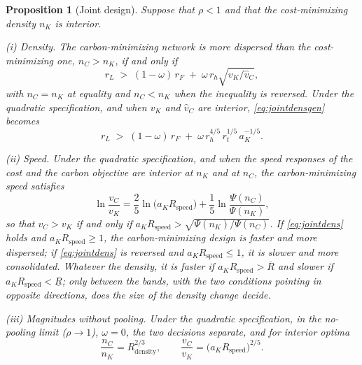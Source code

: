 \documentclass[11pt]{article}
\newtheorem{proposition}{Proposition}
\numberwithin{proposition}{section}
\theoremstyle{definition}
\theoremstyle{remark}
\theoremstyle{plain}
\begin{document}
\begin{proposition}[Joint design]\label{prop:classify}
Suppose that $\rho<1$ and that the cost-minimizing density $n_K$ is interior.

\smallskip\noindent\textup{(i)} \emph{Density.} The carbon-minimizing network is more dispersed than the
cost-minimizing one, $n_C>n_K$, if and only if
\begin{equation}\label{eq:jointdensgen}
  r_L\;>\;(1-\omega)\,r_F\;+\;\omega\,r_h\sqrt{v_K/\hat v_C},
\end{equation}
with $n_C=n_K$ at equality and $n_C<n_K$ when the inequality is reversed. Under the quadratic specification, and
when $v_K$ and $\hat v_C$ are interior, \eqref{eq:jointdensgen} becomes
\begin{equation}\label{eq:jointdens}
  r_L\;>\;(1-\omega)\,r_F\;+\;\omega\,r_h^{4/5}\,r_t^{1/5}\,a_K^{-1/5}.
\end{equation}

\smallskip\noindent\textup{(ii)} \emph{Speed.} Under the quadratic specification, and when the speed responses of
the cost and the carbon objective are interior at $n_K$ and at $n_C$, the carbon-minimizing speed satisfies
\begin{equation}\label{eq:speeddecomp}
  \ln\frac{v_C}{v_K}=\frac25\ln\big(a_KR_{\mathrm{speed}}\big)+\frac15\ln\frac{\Psi(n_C)}{\Psi(n_K)},
\end{equation}
so that $v_C>v_K$ if and only if $a_KR_{\mathrm{speed}}>\sqrt{\Psi(n_K)/\Psi(n_C)}$. If \eqref{eq:jointdens}
holds and $a_KR_{\mathrm{speed}}\ge1$, the carbon-minimizing design is faster and more dispersed; if
\eqref{eq:jointdens} is reversed and $a_KR_{\mathrm{speed}}\le1$, it is slower and more consolidated. Whatever
the density, it is faster if $a_KR_{\mathrm{speed}}>\overline R$ and slower if
$a_KR_{\mathrm{speed}}<\underline R$; only between the bands, with the two conditions pointing in opposite
directions, does the size of the density change decide.

\smallskip\noindent\textup{(iii)} \emph{Magnitudes without pooling.} Under the quadratic specification, in the
no-pooling limit ($\rho\to1$), $\omega=0$, the two decisions separate, and for interior optima
\[
  \frac{n_C}{n_K}=R_{\mathrm{density}}^{2/3},\qquad \frac{v_C}{v_K}=\big(a_KR_{\mathrm{speed}}\big)^{2/5}.
\]
\end{proposition}
\end{document}
